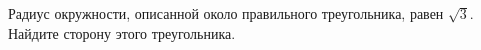 \begin{ex}
	\begin{condition}
		Радиус окружности, описанной около правильного треугольника, равен \( \sqrt{3} \). Найдите сторону этого треугольника.
	\end{condition}
\end{ex}